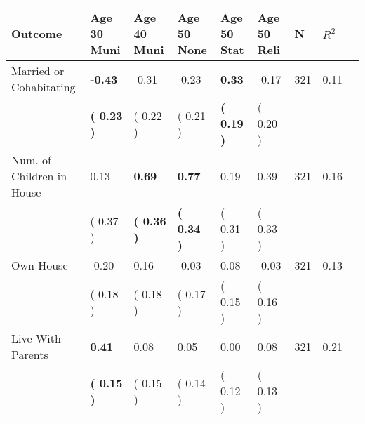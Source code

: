 \begin{tabular}{L{6.2cm} C{1.8cm} C{1.8cm} C{1.8cm} C{1.8cm} C{1.8cm} C{1.8cm} C{0.3cm} C{0.3cm}}
\toprule
 \textbf{Outcome} & \textbf{Age 30 Muni} & \textbf{Age 40 Muni} & \textbf{Age 50 None} & \textbf{Age 50 Stat} & \textbf{Age 50 Reli} & \textbf{N} & \textbf{$ R^2$} \\
\midrule
Married or Cohabitating & \textbf{    -0.43} &     -0.31 &     -0.23 & \textbf{     0.33} &     -0.17  & 321 &       0.11 \\ 
 & \textbf{(     0.23 )} & (     0.22 ) & (     0.21 ) & \textbf{(     0.19 )} & (     0.20 )  & \\
Num. of Children in House &      0.13 & \textbf{     0.69} & \textbf{     0.77} &      0.19 &      0.39  & 321 &       0.16 \\ 
 & (     0.37 ) & \textbf{(     0.36 )} & \textbf{(     0.34 )} & (     0.31 ) & (     0.33 )  & \\
Own House &     -0.20 &      0.16 &     -0.03 &      0.08 &     -0.03  & 321 &       0.13 \\ 
 & (     0.18 ) & (     0.18 ) & (     0.17 ) & (     0.15 ) & (     0.16 )  & \\
Live With Parents & \textbf{     0.41} &      0.08 &      0.05 &      0.00 &      0.08  & 321 &       0.21 \\ 
 & \textbf{(     0.15 )} & (     0.15 ) & (     0.14 ) & (     0.12 ) & (     0.13 )  & \\
\bottomrule
\end{tabular}
